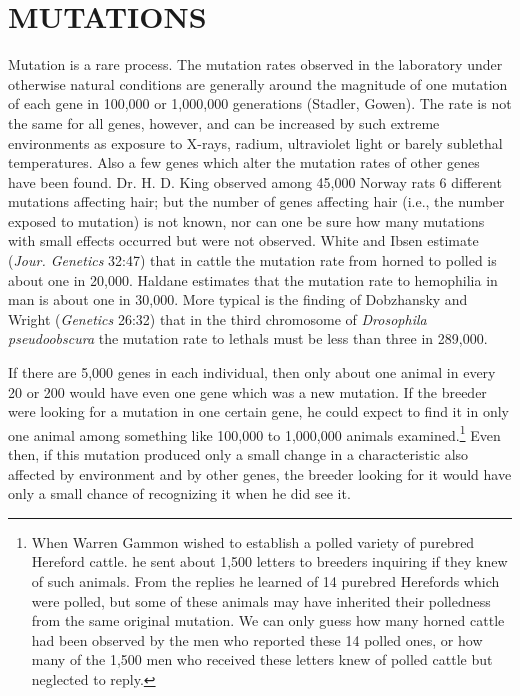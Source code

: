 \section*{MUTATIONS}

Mutation is a rare process. The mutation rates observed in the laboratory
under otherwise natural conditions are generally around the
magnitude of one mutation of each gene in 100,000 or 1,000,000 generations
(Stadler, Gowen). The rate is not the same for all genes, however,
and can be increased by such extreme environments as exposure to
X-rays, radium, ultraviolet light or barely sublethal temperatures. Also
a few genes which alter the mutation rates of other genes have been
found. Dr. H. D. King observed among 45,000 Norway rats 6 different
mutations affecting hair; but the number of genes affecting hair (i.e.,
the number exposed to mutation) is not known, nor can one be sure
how many mutations with small effects occurred but were not observed.
White and Ibsen estimate (\textit{Jour. Genetics} 32:47) that in cattle the
mutation rate from horned to polled is about one in 20,000. Haldane
estimates that the mutation rate to hemophilia in man is about one in
30,000. More typical is the finding of Dobzhansky and Wright (\textit{Genetics}
26:32) that in the third chromosome of \textit{Drosophila pseudoobscura}
the mutation rate to lethals must be less than three in 289,000.

If there are 5,000 genes in each individual, then only about one
animal in every 20 or 200 would have even one gene which was a new
mutation. If the breeder were looking for a mutation in one certain
gene, he could expect to find it in only one animal among something
like 100,000 to 1,000,000 animals examined.\footnote{When Warren Gammon
wished to establish a polled variety of purebred Hereford
cattle. he sent about 1,500 letters to breeders inquiring if they knew of such
animals. From the replies he learned of 14 purebred Herefords which were polled,
but some of these animals may have inherited their polledness from the same original
mutation. We can only guess how many horned cattle had been observed by the men
who reported these 14 polled ones, or how many of the 1,500 men who received these
letters knew of polled cattle but neglected to reply.}
Even then, if this mutation produced only a small change in a characteristic also affected by
environment and by other genes, the breeder looking for it would have
only a small chance of recognizing it when he did see it.

